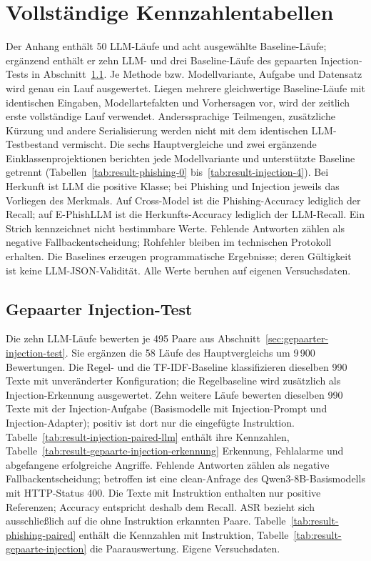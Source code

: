 \section{Vollständige Kennzahlentabellen}
Der Anhang enthält 50 LLM-Läufe und acht ausgewählte Baseline-Läufe; ergänzend enthält er zehn LLM- und drei Baseline-Läufe des gepaarten Injection-Tests in Abschnitt~\ref{app:gepaarter-injection-test}. Je Methode bzw. Modellvariante, Aufgabe und Datensatz wird genau ein Lauf ausgewertet. Liegen mehrere gleichwertige Baseline-Läufe mit identischen Eingaben, Modellartefakten und Vorhersagen vor, wird der zeitlich erste vollständige Lauf verwendet. Anderssprachige Teilmengen, zusätzliche Kürzung und andere Serialisierung werden nicht mit dem identischen LLM-Testbestand vermischt.
Die sechs Hauptvergleiche und zwei ergänzende Einklassenprojektionen berichten jede Modellvariante und unterstützte Baseline getrennt (Tabellen~\ref{tab:result-phishing-0} bis~\ref{tab:result-injection-4}). Bei Herkunft ist LLM die positive Klasse; bei Phishing und Injection jeweils das Vorliegen des Merkmals. Auf Cross-Model ist die Phishing-Accuracy lediglich der Recall; auf E-PhishLLM ist die Herkunfts-Accuracy lediglich der LLM-Recall. Ein Strich kennzeichnet nicht bestimmbare Werte. Fehlende Antworten zählen als negative Fallbackentscheidung; Rohfehler bleiben im technischen Protokoll erhalten. Die Baselines erzeugen programmatische Ergebnisse; deren Gültigkeit ist keine LLM-JSON-Validität. Alle Werte beruhen auf eigenen Versuchsdaten.

\subsection{Gepaarter Injection-Test}\label{app:gepaarter-injection-test}

Die zehn LLM-Läufe bewerten je 495 Paare aus Abschnitt~\ref{sec:gepaarter-injection-test}. Sie ergänzen die 58 Läufe des Hauptvergleichs um 9\,900 Bewertungen. Die Regel- und die TF-IDF-Baseline klassifizieren dieselben 990 Texte mit unveränderter Konfiguration; die Regelbaseline wird zusätzlich als Injection-Erkennung ausgewertet. Zehn weitere Läufe bewerten dieselben 990 Texte mit der Injection-Aufgabe (Basismodelle mit Injection-Prompt und Injection-Adapter); positiv ist dort nur die eingefügte Instruktion. Tabelle~\ref{tab:result-injection-paired-llm} enthält ihre Kennzahlen, Tabelle~\ref{tab:result-gepaarte-injection-erkennung} Erkennung, Fehlalarme und abgefangene erfolgreiche Angriffe. Fehlende Antworten zählen als negative Fallbackentscheidung; betroffen ist eine clean-Anfrage des Qwen3-8B-Basismodells mit HTTP-Status 400. Die Texte mit Instruktion enthalten nur positive Referenzen; Accuracy entspricht deshalb dem Recall. ASR bezieht sich ausschließlich auf die ohne Instruktion erkannten Paare. Tabelle~\ref{tab:result-phishing-paired} enthält die Kennzahlen mit Instruktion, Tabelle~\ref{tab:result-gepaarte-injection} die Paarauswertung. Eigene Versuchsdaten.

